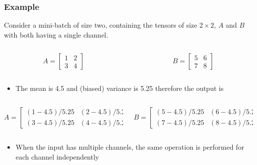 \documentclass{beamer}
\begin{document}
\begin{frame}
    \frametitle{Example}
Consider a mini-batch of size two, containing the tensors of size $2\times 2$, $A$ and $B$ with both having a single channel.


\begin{columns}
    
    \begin{column}{0.5\textwidth}
        \[
    A=\begin{bmatrix}
        1 &2 \\
        3 & 4
    \end{bmatrix}    
    \]
    \end{column}
  \begin{column}{0.5\textwidth}
      \[
        B=\begin{bmatrix}
         5 &6 \\
         7 & 8
        \end{bmatrix}    
      \]
  \end{column}

\end{columns}
\begin{itemize}
    \item The mean is 4.5 and (biased) variance is 5.25 therefore the output is
\end{itemize}
 
\begin{columns}
    
    \begin{column}{0.45\textwidth}
        \[
    A=\left[\begin{smallmatrix}
        (1-4.5)/5.25 &(2-4.5)/5.25 \\
        (3-4.5)/5.25 & (4-4.5)/5.25
    \end{smallmatrix}    \right]
    \]
    \end{column}
  \begin{column}{0.45\textwidth}
    \[ 
        B=\left[\begin{smallmatrix}
         (5-4.5)/5.25 & (6-4.5)/5.25 \\
         (7-4.5)/5.25 & (8-4.5)/5.25
        \end{smallmatrix}\right]    
      \]
     
  \end{column}
  
\end{columns}
\begin{itemize}
    \item When the input has multiple channels, the same operation is performed for each channel independently
    \end{itemize}
\end{frame}
\end{document}
